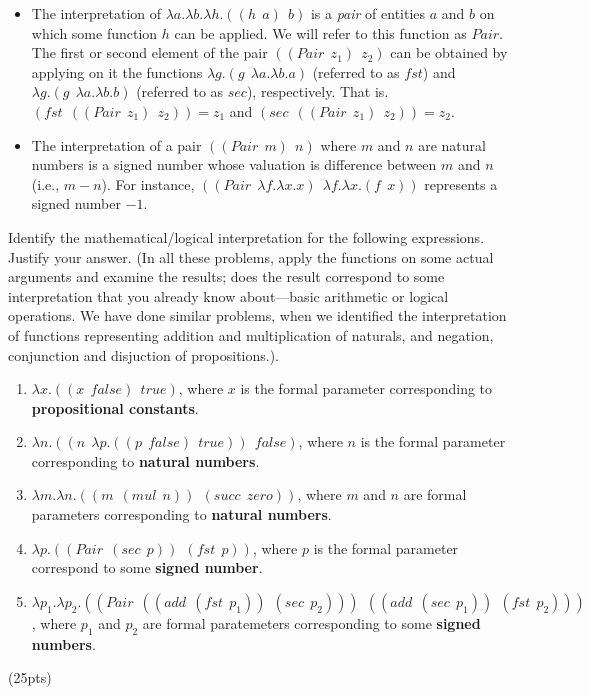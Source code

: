 \documentclass[11pt]{article}
\newcommand{\lmda}[2]{\lambda #1.#2}
\newcommand{\appl}[2]{(#1\ \ #2)}
\begin{document}
\begin{enumerate}
\begin{itemize}
\item The interpretation of
  $\lmda{a}{\lmda{b}{\lmda{h}{\appl{\appl{h}{a}}{b}}}}$ is
  a \emph{pair} of entities $a$ and $b$ on which some function $h$ can
  be applied. We will refer to this function as $Pair$. The first or
  second element of the pair $\appl{\appl{Pair}{z_1}}{z_2}$ can be
  obtained by applying on it the functions
  $\lmda{g}{\appl{g}{\lmda{a}{\lmda{b}{a}}}}$ (referred to as $fst$)
  and $\lmda{g}{\appl{g}{\lmda{a}{\lmda{b}{b}}}}$ (referred to as
  $sec$), respectively. That is.
  $\appl{fst}{\appl{\appl{Pair}{z_1}}{z_2}} = z_1$ and
  $\appl{sec}{\appl{\appl{Pair}{z_1}}{z_2}} = z_2$.
%
\item The interpretation of a pair $\appl{\appl{Pair}{m}}{n}$ where
  $m$ and $n$ are natural numbers is a signed number whose valuation
  is difference between $m$ and $n$ (i.e., $m-n$). For instance,\linebreak
  $\appl{\appl{Pair}{\lmda{f}{\lmda{x}{x}}}}{\lmda{f}{\lmda{x}{\appl{f}{x}}}}$
  represents a signed number $-1$.

\end{itemize}
Identify the mathematical/logical interpretation for the following
expressions. Justify your answer. (In all these problems, apply the
functions on some actual arguments and examine the results; does the
result correspond to some interpretation that you already know
about---basic arithmetic or logical operations. We have done similar
problems, when we identified the interpretation of functions
representing addition and multiplication of naturals, and negation,
conjunction and disjuction of propositions.).
%
\begin{enumerate}
\item 
$\lmda{x}{\appl{\appl{x}{false}}{true}}$, where $x$ is the formal
parameter corresponding to \textbf{propositional constants}.

\item 
$\lmda{n}{\appl{\appl{n}{\lmda{p}{\appl{\appl{p}{false}}{true}}}}{false}}$,
where $n$ is the formal parameter corresponding to \textbf{natural
  numbers}. 

\item 
$\lmda{m}{\lmda{n}{\appl{\appl{m}{\appl{mul}{n}}}{\appl{succ}{zero}}}}$,
  where $m$ and $n$ are formal parameters corresponding to \textbf{natural
  numbers}.

\item $\lmda{p}{\appl{\appl{Pair}{\appl{sec}{p}}}{\appl{fst}{p}}}$,
where $p$ is the formal parameter correspond to some \textbf{signed number}.

\item 
$\lmda{p_1}{\lmda{p_2}{\appl{\appl{Pair}{\appl{\appl{add}{\appl{fst}{p_1}}}{\appl{sec}{p_2}}}}{\appl
{\appl{add}{\appl{sec}{p_1}}}{\appl{fst}{p_2}}}}}$, where $p_1$ and
$p_2$ are formal paratemeters corresponding to some \textbf{signed
numbers}.

\end{enumerate}
\hfill(25pts)

\end{enumerate}
\end{document}
